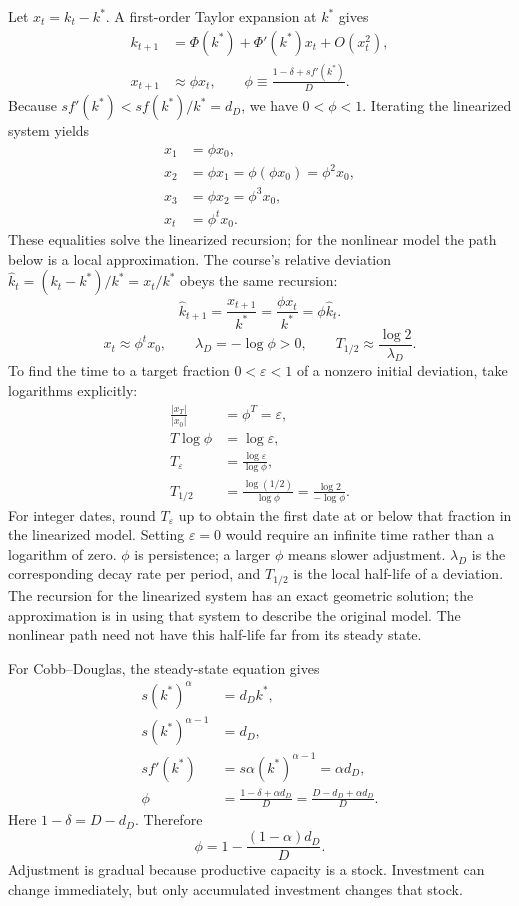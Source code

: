 Let $x_t=k_t-k^*$. A first-order Taylor expansion at $k^*$ gives
\begin{align}
k_{t+1}&=\Phi(k^*)+\Phi'(k^*)x_t+O(x_t^2),\\
x_{t+1}&\approx\phi x_t,\qquad
\phi\equiv\frac{1-\delta+sf'(k^*)}{D}.
\end{align}
Because $sf'(k^*)<sf(k^*)/k^*=d_D$, we have $0<\phi<1$. Iterating the
linearized system yields
\begin{align}
x_1&=\phi x_0,\\
x_2&=\phi x_1=\phi(\phi x_0)=\phi^2x_0,\\
x_3&=\phi x_2=\phi^3x_0,\\
x_t&=\phi^t x_0.
\end{align}
These equalities solve the linearized recursion; for the nonlinear model
the path below is a local approximation. The course's relative deviation
$\hat k_t=(k_t-k^*)/k^*=x_t/k^*$ obeys the same recursion:
\[
\hat k_{t+1}=\frac{x_{t+1}}{k^*}
 =\frac{\phi x_t}{k^*}=\phi\hat k_t.
\]
\begin{equation}\label{eq:solow-discrete-speed}
x_t\approx\phi^t x_0,\qquad
\lambda_D=-\log\phi>0,\qquad
T_{1/2}\approx\frac{\log2}{\lambda_D}.
\end{equation}
To find the time to a target fraction $0<\varepsilon<1$ of a nonzero
initial deviation, take logarithms explicitly:
\begin{align}
\frac{|x_T|}{|x_0|}&=\phi^T=\varepsilon,\\
T\log\phi&=\log\varepsilon,\\
T_\varepsilon&=\frac{\log\varepsilon}{\log\phi},\\
T_{1/2}&=\frac{\log(1/2)}{\log\phi}
        =\frac{\log2}{-\log\phi}.
\end{align}
For integer dates, round $T_\varepsilon$ up to obtain the first date at
or below that fraction in the linearized model. Setting $\varepsilon=0$
would require an infinite time rather than a logarithm of zero.
$\phi$ is persistence; a larger $\phi$ means slower adjustment. $\lambda_D$ is
the corresponding decay rate per period, and $T_{1/2}$ is the local half-life
of a deviation. The recursion for the linearized system has an exact geometric solution;
the approximation is in using that system to describe the original model.
The nonlinear path need not have this half-life far from its steady state.

For Cobb--Douglas, the steady-state equation gives
\begin{align}
s(k^*)^\alpha&=d_Dk^*,\\
s(k^*)^{\alpha-1}&=d_D,\\
sf'(k^*)&=s\alpha(k^*)^{\alpha-1}=\alpha d_D,\\
\phi&=\frac{1-\delta+\alpha d_D}{D}
      =\frac{D-d_D+\alpha d_D}{D}.
\end{align}
Here $1-\delta=D-d_D$. Therefore
\begin{equation}
\phi=1-\frac{(1-\alpha)d_D}{D}.
\end{equation}
Adjustment is gradual because productive capacity is a stock. Investment can
change immediately, but only accumulated investment changes that stock.

